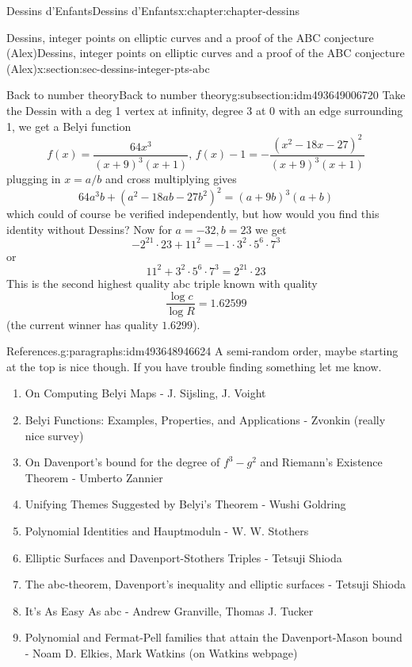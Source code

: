 \documentclass[oneside,10pt,]{book}
\numberwithin{equation}{section}
\begin{document}
\begin{chapterptx}{Dessins d'Enfants}{}{Dessins d'Enfants}{}{}{x:chapter:chapter-dessins}
\begin{sectionptx}{Dessins, integer points on elliptic curves and a proof of the ABC conjecture (Alex)}{}{Dessins, integer points on elliptic curves and a proof of the ABC conjecture (Alex)}{}{}{x:section:sec-dessins-integer-pts-abc}
\begin{subsectionptx}{Back to number theory}{}{Back to number theory}{}{}{g:subsection:idm493649006720}
Take the Dessin with a deg 1 vertex at infinity, degree 3 at 0 with an edge surrounding 1, we get a Belyi function%
\begin{equation*}
f(x) = \frac{64x^3}{(x+9)^3 (x+1)},\,f(x) - 1 = -\frac{(x^2 - 18x -27)^2}{(x+9)^3(x+1)}
\end{equation*}
plugging in \(x=a/b\) and cross multiplying gives%
\begin{equation*}
64a^3 b + (a^2 - 18ab - 27b^2)^2 = (a+9b)^3(a+b)
\end{equation*}
which could of course be verified independently, but how would you find this identity without Dessins? Now for \(a = -32, b= 23\) we get%
\begin{equation*}
- 2^{21} \cdot 23 +  11^2 =  -1 \cdot 3^2 \cdot 5^6 \cdot 7^3
\end{equation*}
or%
\begin{equation*}
11^2 + 3^2 \cdot 5^6 \cdot 7^3 = 2^{21} \cdot 23
\end{equation*}
This is the second highest quality abc triple known with quality%
\begin{equation*}
\frac{\log c}{\log R} = 1.62599
\end{equation*}
(the current winner has quality \(1.6299\)).%
\begin{paragraphs}{References.}{g:paragraphs:idm493648946624}%
A semi-random order, maybe starting at the top is nice though. If you have trouble finding something let me know.%
\begin{enumerate}
\item{}On Computing Belyi Maps - J. Sijsling, J. Voight%
\item{}Belyi Functions: Examples, Properties, and Applications - Zvonkin (really nice survey)%
\item{}On Davenport’s bound for the degree of \(f^3 - g^2\) and Riemann's Existence Theorem - Umberto Zannier%
\item{}Unifying Themes Suggested by Belyi's Theorem - Wushi Goldring%
\item{}Polynomial Identities and Hauptmoduln - W. W. Stothers%
\item{}Elliptic Surfaces and Davenport-Stothers Triples -  Tetsuji Shioda%
\item{}The abc-theorem, Davenport’s inequality and elliptic surfaces - Tetsuji Shioda%
\item{}It's As Easy As abc -  Andrew Granville, Thomas J. Tucker%
\item{}Polynomial and Fermat-Pell families that attain the Davenport-Mason bound - Noam D. Elkies, Mark Watkins (on Watkins webpage)%

\end{enumerate}
\end{paragraphs}
\end{subsectionptx}
\end{sectionptx}
\end{chapterptx}
\end{document}
